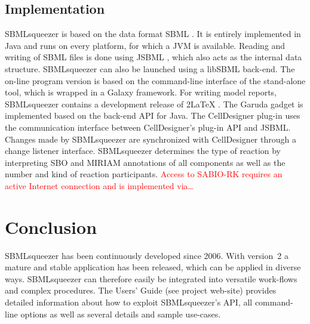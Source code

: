\documentclass{bioinfo}
\newcommand{\SBMLLaTeX}{{\sffamily\upshape\raisebox{-.35ex}{S\hspace{-.425ex}BML}\hspace{-0.5ex}2\LaTeX}}
\begin{document}
\vspace{-.45cm}
\begin{methods}
\section{Implementation}
SBMLsqueezer is based on the data format SBML \citep{Hucka2004}.
It is entirely implemented in Java\texttrademark{} and runs on every platform, for which a JVM is available.
Reading and writing of SBML files is done using JSBML \citep{Draeger2011b}, which also acts as the internal data structure.
SBMLsqueezer can also be launched using a libSBML \citep{Bornstein2008} back-end.
The on-line program version is based on the command-line interface of the stand-alone tool, which is wrapped in a Galaxy \citep{Goecks2010} framework.
For writing model reports, SBMLsqueezer contains a development release of \SBMLLaTeX{} \citep{Draeger2009a}.
The Garuda gadget \citep{Ghosh2011} is implemented based on the back-end API for Java\texttrademark.
The CellDesigner plug-in uses the communication interface between CellDesigner's plug-in API and JSBML.
Changes made by SBMLsqueezer are synchronized with CellDesigner through a change listener interface.
SBMLsqueezer determines the type of reaction by interpreting SBO and MIRIAM annotations \citep{Courtot2011} of all components as well as the number and kind of reaction participants.
\textcolor{red}{Access to SABIO-RK \citep{Wittig2012} requires an active Internet connection and is implemented via\ldots}
\end{methods}

%
%
\section{Conclusion}

SBMLsqueezer has been continuously developed since 2006.
With version~2 a mature and stable application has been released, which can be applied in diverse ways.
SBMLsqueezer can therefore easily be integrated into versatile work-flows and complex procedures.
The Users' Guide (see project web-site) provides detailed information about how to exploit SBMLsqueezer's API, all command-line options as well as several details and sample use-cases.
\end{document}
